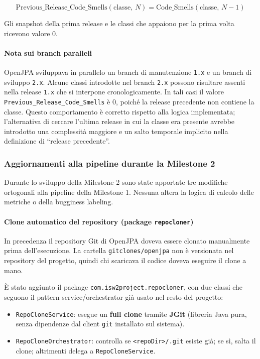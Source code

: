 \[
\text{Previous\_Release\_Code\_Smells}(\text{classe},\, N) = \text{Code\_Smells}(\text{classe},\, N-1)
\]

Gli snapshot della prima release e le classi che appaiono per la prima volta ricevono
valore 0.

\paragraph{Nota sui branch paralleli}

OpenJPA sviluppava in parallelo un branch di manutenzione \texttt{1.x} e un branch di
sviluppo \texttt{2.x}. Alcune classi introdotte nel branch \texttt{2.x} possono risultare
assenti nella release \texttt{1.x} che si interpone cronologicamente. In tali casi il
valore \texttt{Previous\_Release\_Code\_Smells} è 0, poiché la release precedente non
contiene la classe. Questo comportamento è corretto rispetto alla logica implementata;
l'alternativa di cercare l'ultima release in cui la classe era presente avrebbe introdotto
una complessità maggiore e un salto temporale implicito nella definizione di
``release precedente''.

\subsubsection{Aggiornamenti alla pipeline durante la Milestone 2}

Durante lo sviluppo della Milestone 2 sono state apportate tre modifiche ortogonali alla
pipeline della Milestone 1. Nessuna altera la logica di calcolo delle metriche o della
bugginess labeling.

\paragraph{Clone automatico del repository (package \texttt{repocloner})}

In precedenza il repository Git di OpenJPA doveva essere clonato manualmente prima
dell'esecuzione. La cartella \texttt{gitclones/openjpa} non è versionata nel repository
del progetto, quindi chi scaricava il codice doveva eseguire il clone a mano.

È stato aggiunto il package \texttt{com.isw2project.repocloner}, con due classi che
seguono il pattern service/orchestrator già usato nel resto del progetto:

\begin{itemize}
\item \texttt{RepoCloneService}: esegue un \textbf{full clone} tramite \textbf{JGit}
(libreria Java pura, senza dipendenze dal client \texttt{git} installato sul sistema).
\item \texttt{RepoCloneOrchestrator}: controlla se \texttt{<repoDir>/.git} esiste già;
se sì, salta il clone; altrimenti delega a \texttt{RepoCloneService}.
\end{itemize}

